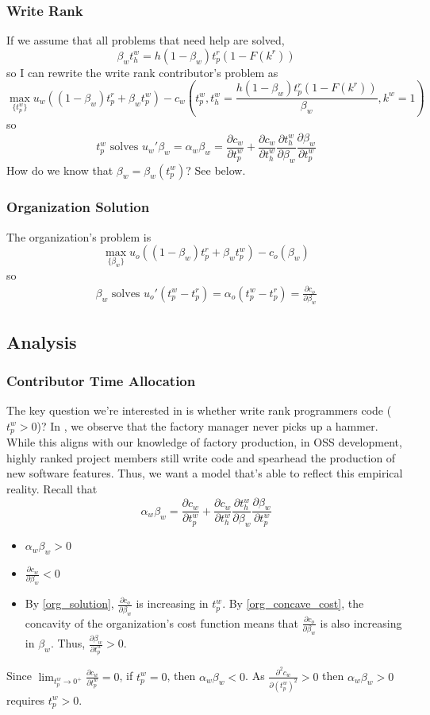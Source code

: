 \documentclass[source/paper/main.tex]{subfiles}
\begin{document}
\subsubsection{Write Rank}
If we assume that all problems that need help are solved, $$\beta_w t_h^w = h(1-\beta_w) t_p^r (1-F(k^r))$$ so I can rewrite the write rank contributor's problem as
$$\max_{\{t_p^w\}} u_w\left((1-\beta_w) t_p^r + \beta_w t_p^w \right) - c_w\left(t_p^w, t_h^w = \frac{ h (1-\beta_w) t_p^r(1-F(k^r))}{\beta_w}, k^w = 1\right)$$
so $$t_p^w \text{ solves } u_w' \beta_w = \alpha_w \beta_w = \frac{\partial c_w}{\partial t_p^w} + \frac{\partial c_w}{\partial t_h^w}\frac{\partial t_h^w}{\partial \beta_w}\frac{\partial \beta_w}{\partial t_p^w}$$
How do we know that $\beta_w = \beta_w(t_p^w)$? See below. 
\subsubsection{Organization Solution}
The organization's problem is 
$$\max_{\{\beta_w\}} u_o\left((1-\beta_w) t_p^r + \beta_w t_p^w\right) - c_o(\beta_w)$$ 
so 
\begin{align}
    \beta_w \text{ solves } u_o'(t_p^w - t_p^r) = \alpha_o (t_p^w - t_p^r) = \frac{\partial c_o}{\partial \beta_w} \label{org_solution}
\end{align}


\subsection{Analysis}
\subsubsection{Contributor Time Allocation}
The key question we're interested in is whether write rank programmers code ($t_p^w>0$)? In \cite{garicano_hierarchies_2000}, we observe that the factory manager never picks up a hammer. While this aligns with our knowledge of factory production, in OSS development, highly ranked project members still write code and spearhead the production of new software features. Thus, we want a model that's able to reflect this empirical reality. 
Recall that $$\alpha_w \beta_w = \frac{\partial c_w}{\partial t_p^w} + \frac{\partial c_w}{\partial t_h^w}\frac{\partial t_h^w}{\partial \beta_w}\frac{\partial \beta_w}{\partial t_p^w}$$
\begin{itemize}
    \item $\alpha_w \beta_w>0$ 
    \item $\frac{\partial c_w}{\partial \beta_w} < 0$
    \item By \ref{org_solution}, $\frac{\partial c_o}{\partial \beta_w}$ is increasing in $t_p^w$. By \ref{org_concave_cost}, the concavity of the organization's cost function means that $\frac{\partial c_o}{\partial \beta_w}$ is also increasing in $\beta_w$. Thus, $\frac{\partial \beta_w}{\partial t_p^w} > 0$.
\end{itemize}
Since $\lim_{t_p^w \to 0^+} \frac{\partial c_w}{\partial t_p^w} = 0$, if $t_p^w = 0$, then $\alpha_w\beta_w < 0$. As $\frac{\partial^2 c_w}{\partial (t_p^w)^2}>0$ then $\alpha_w \beta_w>0$ requires $t_p^w>0$. 
\end{document}
